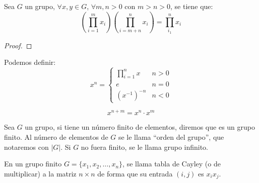 
\begin{prop}
    Sea $G$ un grupo, $\forall x,y\in G$, $\forall m,n > 0$ con $m>n>0$, se tiene que:
    \begin{equation*}
        \left(\prod_{i=1}^m x_i\right) \left(\prod_{i=m+n}^nx_i\right) = \prod_{i_1}^n x_i
    \end{equation*}
    \begin{proof} %
    \end{proof}
\end{prop}

\begin{definicion}[Potencia]
    Podemos definir:
    \begin{equation*}
        x^n = \left\{\begin{array}{cr}
                \prod_{i=1}^n x & n > 0 \\
                e & n = 0 \\
                {(x^{-1})}^{-n} & n < 0
        \end{array}\right.
    \end{equation*}
\end{definicion}

\begin{prop}
    \begin{equation*}
        x^{n+m} = x^n \cdot x^m
    \end{equation*}
\end{prop}

\begin{definicion}
    Sea $G$ un grupo, si tiene un número finito de elementos, diremos que es un grupo finito. Al número de elementos de $G$ se le llama ``orden del grupo'', que notaremos con $|G|$. Si $G$ no fuera finito, se le llama grupo infinito.
\end{definicion}

\begin{definicion}
    En un grupo finito $G=\{x_1,x_2,\ldots,x_n\}$, se llama tabla de Cayley (o de multiplicar) a la matriz $n\times n$ de forma que su entrada $(i,j)$ es $x_ix_j$.
\end{definicion}

